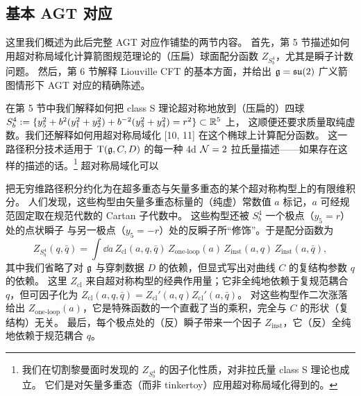 \subsection{基本 AGT 对应}

这里我们概述为此后完整 AGT 对应作铺垫的两节内容。
首先，第 5 节描述如何用超对称局域化计算箭图规范理论的（压扁）球面配分函数 $Z_{S^4_b}$，尤其是瞬子计数问题。
然后，第 6 节解释 Liouville CFT 的基本方面，并给出 $\mathfrak{g}=\mathfrak{su}(2)$ 广义箭图情形下 AGT 对应的精确陈述。

在第 5 节中我们解释如何把 class S 理论超对称地放到（压扁的）四球
$S^4_b:=\{y_5^2+b^2(y_1^2+y_2^2)+b^{-2}(y_3^2+y_4^2)=r^2\}\subset\mathbb{R}^5$ 上，
这顺便还要求质量取纯虚数。我们还解释如何用超对称局域化 [10, 11] 在这个椭球上计算配分函数。
这一路径积分技术适用于 $\mathrm{T}(\mathfrak{g},C,D)$ 的每一种 4d $\mathcal{N}=2$ 拉氏量描述------如果存在这样的描述的话。\footnote{我们在切割黎曼面时发现的 $Z_{S^4_b}$ 的因子化性质，对非拉氏量 class S 理论也成立。
它们是对矢量多重态（而非 tinkertoy）应用超对称局域化得到的。}
超对称局域化可以

把无穷维路径积分约化为在超多重态与矢量多重态的某个超对称构型上的有限维积分。
人们发现，这些构型由矢量多重态标量的（纯虚）常数值 $a$ 标记，$a$ 可经规范固定取在规范代数的 Cartan 子代数中。
这些构型还被 $S^4_b$ 一个极点（$y_5=r$）处的点状瞬子
与另一极点（$y_5=-r$）处的反瞬子所“修饰”。于是配分函数为
\begin{equation}
  Z_{S^4_b}(q,\bar q)=\int \dd a\, Z_{\mathrm{cl}}(a,q,\bar q)\, Z_{\mathrm{one\text{-}loop}}(a)\,
  Z_{\mathrm{inst}}(a,q)\, Z_{\mathrm{inst}}(a,\bar q),
  \tag{1.7}
\end{equation}
其中我们省略了对 $\mathfrak{g}$ 与穿刺数据 $D$ 的依赖，但显式写出对曲线 $C$ 的复结构参数 $q$ 的依赖。
这里 $Z_{\mathrm{cl}}$ 来自超对称构型的经典作用量；它非全纯地依赖于复规范耦合 $q$，但可因子化为
$Z_{\mathrm{cl}}(a,q,\bar q)=Z_{\mathrm{cl}}'(a,q)Z_{\mathrm{cl}}'(a,\bar q)$。
对这些构型作二次涨落给出 $Z_{\mathrm{one\text{-}loop}}(a)$，它是特殊函数的一个直截了当的乘积，完全与 $C$ 的形状（复结构）无关。
最后，每个极点处的（反）瞬子带来一个因子 $Z_{\mathrm{inst}}$，它（反）全纯地依赖于规范耦合 $q$。

